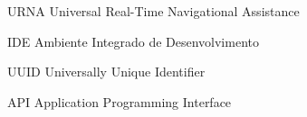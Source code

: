 \begin{siglas}
	\item[URNA] Universal Real-Time Navigational Assistance
	\item[IDE] Ambiente Integrado de Desenvolvimento
	\item[UUID] Universally Unique Identifier
	\item[API] Application Programming Interface
\end{siglas}


